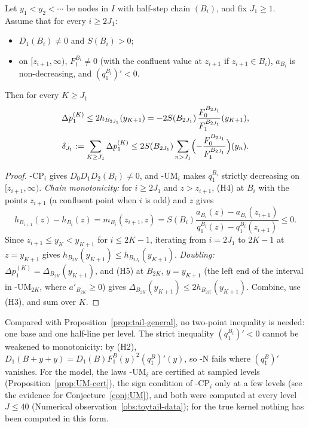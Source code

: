 \begin{theorem}\label{thm:Tprime}
Let $y_1<y_2<\cdots$ be nodes in $I$ with half-step chain $(B_i)$, and fix $J_1\ge1$. Assume that for every
$i\ge2J_1$:
\begin{itemize}[leftmargin=2em]
\item[\hyp{CP}$_i$] $D_1(B_i)\ne0$ and $S(B_i)>0$;
\item[\hyp{UM}$_i$] on $[z_{i+1},\infty)$, $F_1^{B_i}\ne0$ (with the confluent value at $z_{i+1}$ if $z_{i+1}\in B_i$),
$a_{B_i}$ is non-decreasing, and $(q_1^{B_i})'<0$.
\end{itemize}
Then for every $K\ge J_1$
\begin{gather*}
\Delta p_1^{(K)}\le2h_{B_{2J_1}}(y_{K+1})=-2S(B_{2J_1})\,\frac{F_0^{B_{2J_1}}}{F_1^{B_{2J_1}}}(y_{K+1}),\\
\delta_{J_1}:=\sum_{K\ge J_1}\Delta p_1^{(K)}\le2S(B_{2J_1})\sum_{n>J_1}\Bigl(-\frac{F_0^{B_{2J_1}}}{F_1^{B_{2J_1}}}\Bigr)(y_n).
\end{gather*}
\end{theorem}

\begin{proof}
\hyp{CP}$_i$ gives $D_0D_1D_2(B_i)\ne0$, and \hyp{UM}$_i$ makes $q_1^{B_i}$ strictly decreasing on
$[z_{i+1},\infty)$. \emph{Chain monotonicity:} for $i\ge2J_1$ and $z>z_{i+1}$, (H4) at $B_i$ with the points
$z_{i+1}$ (a confluent point when $i$ is odd) and $z$ gives
\[
h_{B_{i+1}}(z)-h_{B_i}(z)=m_{B_i}(z_{i+1},z)=S(B_i)\frac{a_{B_i}(z)-a_{B_i}(z_{i+1})}{q_1^{B_i}(z)-q_1^{B_i}(z_{i+1})}\le0.
\]
Since $z_{i+1}\le y_K<y_{K+1}$ for $i\le2K-1$, iterating from $i=2J_1$ to $2K-1$ at $z=y_{K+1}$ gives
$h_{B_{2K}}(y_{K+1})\le h_{B_{2J_1}}(y_{K+1})$. \emph{Doubling:}
$\Delta p_1^{(K)}=\Delta_{B_{2K}}(y_{K+1})$, and (H5) at $B_{2K}$, $y=y_{K+1}$ (the left end of the interval in
\hyp{UM}$_{2K}$, where $a'_{B_{2K}}\ge0$) gives $\Delta_{B_{2K}}(y_{K+1})\le2h_{B_{2K}}(y_{K+1})$. Combine, use (H3),
and sum over $K$.
\end{proof}

Compared with Proposition~\ref{prop:tail-general}, no two-point inequality is needed: one base and one half-line per
level. The strict inequality $(q_1^{B_i})'<0$ cannot be weakened to monotonicity: by (H2),
$D_1(B+y+y)=D_1(B)F_1^B(y)^2(q_1^B)'(y)$, so \hyp{N} fails where $(q_1^B)'$ vanishes. For the model, the laws \hyp{UM}$_i$ are
certified at sampled levels (Proposition~\ref{prop:UM-cert}), the sign condition of \hyp{CP}$_i$ only at a few levels (see the
evidence for Conjecture~\ref{conj:UM}), and both were computed at every level $J\le40$ (Numerical
observation~\ref{obs:toytail-data}); for the true kernel nothing has been computed in this form.
